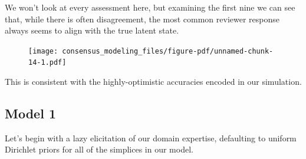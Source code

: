 \documentclass[
  letterpaper,
  DIV=11,
  numbers=noendperiod]{scrartcl}
\newenvironment{Shaded}{\begin{snugshade}}{\end{snugshade}}
\newcommand{\AttributeTok}[1]{\textcolor[rgb]{0.40,0.45,0.13}{#1}}
\newcommand{\ControlFlowTok}[1]{\textcolor[rgb]{0.00,0.23,0.31}{#1}}
\newcommand{\DecValTok}[1]{\textcolor[rgb]{0.68,0.00,0.00}{#1}}
\newcommand{\FloatTok}[1]{\textcolor[rgb]{0.68,0.00,0.00}{#1}}
\newcommand{\FunctionTok}[1]{\textcolor[rgb]{0.28,0.35,0.67}{#1}}
\newcommand{\NormalTok}[1]{\textcolor[rgb]{0.00,0.23,0.31}{#1}}
\newcommand{\SpecialCharTok}[1]{\textcolor[rgb]{0.37,0.37,0.37}{#1}}
\newcommand{\StringTok}[1]{\textcolor[rgb]{0.13,0.47,0.30}{#1}}
\begin{document}
We won't look at every assessment here, but examining the first nine we
can see that, while there is often disagreement, the most common
reviewer response always seems to align with the true latent state.

\begin{Shaded}
\end{Shaded}

\begin{figure}[H]

{\centering \texttt{[image: consensus\_modeling\_files/figure-pdf/unnamed-chunk-14-1.pdf]}

}

\end{figure}

This is consistent with the highly-optimistic accuracies encoded in our
simulation.

\hypertarget{model-1}{%
\subsection{Model 1}\label{model-1}}

Let's begin with a lazy elicitation of our domain expertise, defaulting
to uniform Dirichlet priors for all of the simplices in our model.
\end{document}

